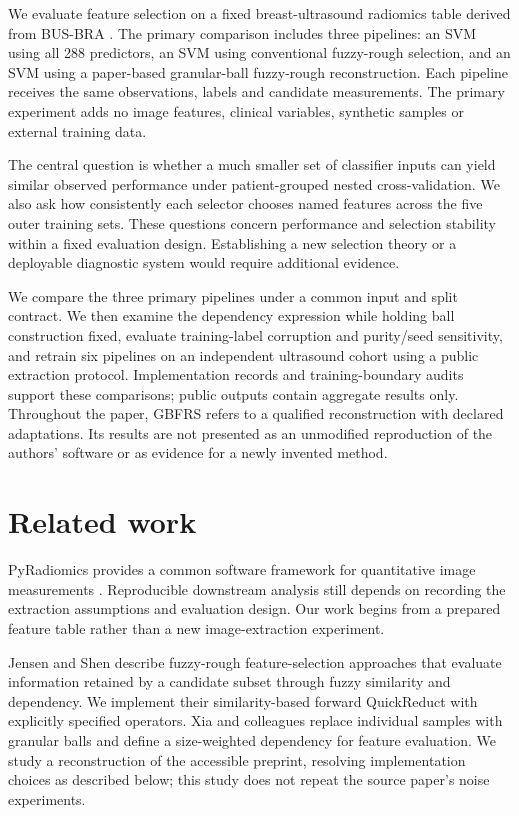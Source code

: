 \documentclass[11pt,a4paper]{article}
\begin{document}
We evaluate feature selection on a fixed breast-ultrasound radiomics table derived from BUS-BRA \cite{busbra}. The primary comparison includes three pipelines: an SVM using all 288 predictors, an SVM using conventional fuzzy-rough selection, and an SVM using a paper-based granular-ball fuzzy-rough reconstruction. Each pipeline receives the same observations, labels and candidate measurements. The primary experiment adds no image features, clinical variables, synthetic samples or external training data.

The central question is whether a much smaller set of classifier inputs can yield similar observed performance under patient-grouped nested cross-validation. We also ask how consistently each selector chooses named features across the five outer training sets. These questions concern performance and selection stability within a fixed evaluation design. Establishing a new selection theory or a deployable diagnostic system would require additional evidence.

We compare the three primary pipelines under a common input and split contract. We then examine the dependency expression while holding ball construction fixed, evaluate training-label corruption and purity/seed sensitivity, and retrain six pipelines on an independent ultrasound cohort using a public extraction protocol. Implementation records and training-boundary audits support these comparisons; public outputs contain aggregate results only. Throughout the paper, GBFRS refers to a qualified reconstruction with declared adaptations. Its results are not presented as an unmodified reproduction of the authors' software or as evidence for a newly invented method.

\section{Related work}
PyRadiomics provides a common software framework for quantitative image measurements \cite{pyradiomics}. Reproducible downstream analysis still depends on recording the extraction assumptions and evaluation design. Our work begins from a prepared feature table rather than a new image-extraction experiment.

Jensen and Shen \cite{jensen} describe fuzzy-rough feature-selection approaches that evaluate information retained by a candidate subset through fuzzy similarity and dependency. We implement their similarity-based forward QuickReduct with explicitly specified operators. Xia and colleagues \cite{xia} replace individual samples with granular balls and define a size-weighted dependency for feature evaluation. We study a reconstruction of the accessible preprint, resolving implementation choices as described below; this study does not repeat the source paper's noise experiments.
\end{document}
